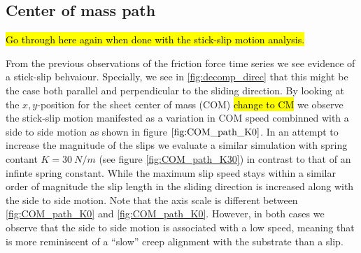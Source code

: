 \subsection{Center of mass path}
\hl{Go through here again when done with the stick-slip motion analysis.}

From the previous observations of the friction force time series we see evidence
of a stick-slip behvaiour. Specially, we see in \cref{fig:decomp_direc}
that this might be the case both parallel and perpendicular to the sliding
direction. By looking at the $x,y$-position for the sheet center of mass (COM) \hl{change to CM}
we observe the stick-slip motion manifested as a variation in COM speed combinned
with a side to side motion as shown in figure $\cref{fig:COM_path_K0}$. In an attempt to increase the magnitude of the slips we evaluate a similar simulation with spring contant $K = \SI{30}{N/m}$ (see figure
\cref{fig:COM_path_K30}) in contrast to that of an infinte spring constant. While
the maximum slip speed stays within a similar order of magnitude the slip length
in the sliding direction is increased along with the side to side motion. Note
that the axis scale is different between \cref{fig:COM_path_K0} and
\cref{fig:COM_path_K0}. However, in both cases we observe that the side to side
motion is associated with a low speed, meaning that is more reminiscent of a ``slow'' creep alignment with the substrate than a slip. 


